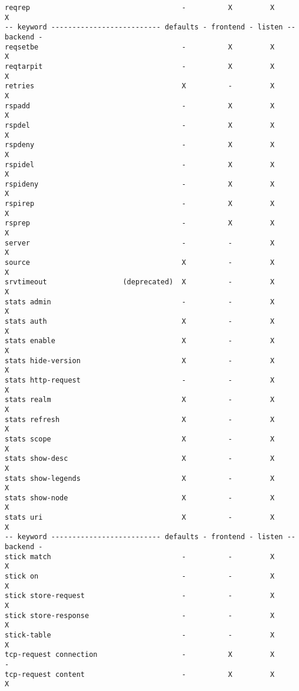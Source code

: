 \begin{verbatim}
reqrep                                    -          X         X         X
-- keyword -------------------------- defaults - frontend - listen -- backend -
reqsetbe                                  -          X         X         X
reqtarpit                                 -          X         X         X
retries                                   X          -         X         X
rspadd                                    -          X         X         X
rspdel                                    -          X         X         X
rspdeny                                   -          X         X         X
rspidel                                   -          X         X         X
rspideny                                  -          X         X         X
rspirep                                   -          X         X         X
rsprep                                    -          X         X         X
server                                    -          -         X         X
source                                    X          -         X         X
srvtimeout                  (deprecated)  X          -         X         X
stats admin                               -          -         X         X
stats auth                                X          -         X         X
stats enable                              X          -         X         X
stats hide-version                        X          -         X         X
stats http-request                        -          -         X         X
stats realm                               X          -         X         X
stats refresh                             X          -         X         X
stats scope                               X          -         X         X
stats show-desc                           X          -         X         X
stats show-legends                        X          -         X         X
stats show-node                           X          -         X         X
stats uri                                 X          -         X         X
-- keyword -------------------------- defaults - frontend - listen -- backend -
stick match                               -          -         X         X
stick on                                  -          -         X         X
stick store-request                       -          -         X         X
stick store-response                      -          -         X         X
stick-table                               -          -         X         X
tcp-request connection                    -          X         X         -
tcp-request content                       -          X         X         X

\end{verbatim}
